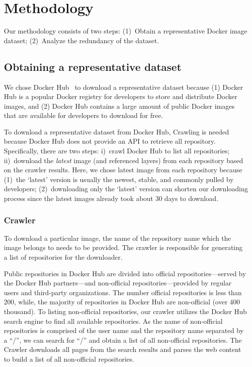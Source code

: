 \section{Methodology}
\label{sec:methodology}



Our methodology consists of two steps:
(1)~Obtain a representative Docker image dataset;
(2)~Analyze the redundancy of the dataset.



\subsection{Obtaining a representative dataset}
\label{sec:crawler}

We chose Docker Hub~\cite{docker-hub} to download a representative dataset because (1) Docker Hub is a popular Docker registry for developers to store and distribute Docker images, and (2) Docker Hub contains a large amount of public Docker images that are available for developers to download for free.

To download a representative dataset from Docker Hub, Crawling is needed because Docker Hub does not provide an API to retrieve all repository. Specifically, there are two steps:
i)~crawl Docker Hub to list all repositories;
ii)~download the \textit{latest} image (and referenced layers) from each repository based
on the crawler results. Here, we chose latest image from each repository because (1)~the `latest' version is usually the newest, stable, and commonly pulled by developers;
(2)~downloading only the `latest' version can shorten our downloading process since the latest images already took about 30 days to download. 


\subsubsection{Crawler}

To download a particular image, %
the name of the repository name which the image belongs to needs to be provided.
The crawler is responsible for generating a list of repositories for the downloader.

Public repositories 
in Docker Hub
are divided into official
repositories---served by the Docker Hub partners---and non-official
repositories---provided by regular users and third-party organizations.
The number official repositories is less than 200, while, the majority
of repositories in Docker Hub are non-official (over 400 thousand).
To listing non-official repositories, our crawler utilizes the Docker Hub search engine to find all available
repositories.
As the name of non-official repositories is comprised
of the user name and the repository name separated by a ``/'', 
we can search for ``/'' and obtain a list of all non-official repositories.
The Crawler downloads all pages from the search results and parses the web content
to build a list of all non-official repositories.

